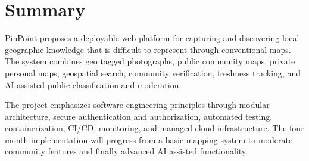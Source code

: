 \documentclass[11pt,a4paper]{article}
\begin{document}
\section{Summary}

PinPoint proposes a deployable web platform for capturing and discovering
local geographic knowledge that is difficult to represent through
conventional maps. The system combines geo tagged photographs, public
community maps, private personal maps, geospatial search, community
verification, freshness tracking, and AI assisted public classification and
moderation.

The project emphasizes software engineering principles through modular
architecture, secure authentication and authorization, automated testing,
containerization, CI/CD, monitoring, and managed cloud infrastructure. The
four month implementation will progress from a basic mapping system to
moderate community features and finally advanced AI assisted functionality.
\end{document}
